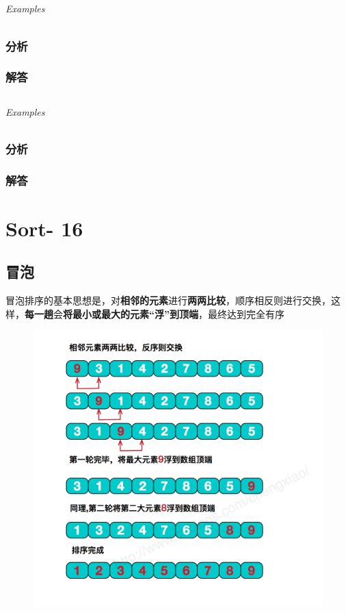 \documentclass[UTF8,a4paper,12pt]{ctexbook}
\begin{document}
\section{}
	
	\subparagraph{Examples}
	
	\subsection{分析}
	
	\subsection{解答}
	
\section{}
	
	\subparagraph{Examples}
	
	\subsection{分析}
	
	\subsection{解答}
\chapter{Sort- 16}
\section{冒泡}
	冒泡排序的基本思想是，对\textbf{相邻的元素}进行\textbf{两两比较}，顺序相反则进行交换，这样，\textbf{每一趟}会\textbf{将最小或最大的元素“浮”到顶端}，最终达到完全有序
	
		\begin{figure}[h]
			\centering
			\includegraphics[scale = 0.7]{Pop.png}
		\end{figure}
	
\end{document}
